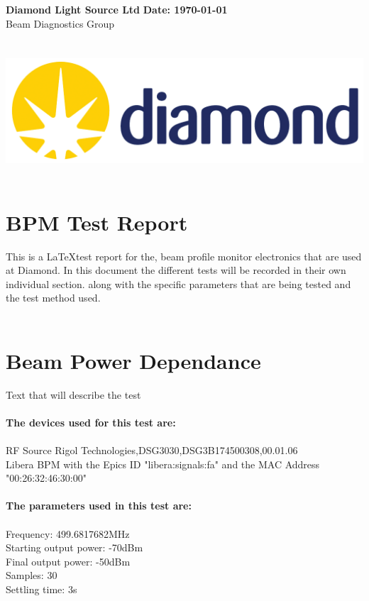 \documentclass[a4paper, 11pt]{article}%
\begin{document}
%
\normalsize%
\noindent%
\large\textbf{Diamond Light Source Ltd} \hfill\large\textbf{Date: \today}%
\\\normalsize Beam Diagnostics Group \hfill\\%
\\\\\includegraphics[width = 1\textwidth]{./Latex_Report/Logo.PNG}\\\\%
\section*{BPM Test Report}%
This is a \LaTeX test report for the, beam profile monitor electronics that are used at Diamond. In this document the different tests will be recorded in their own individual section. along with the specific parameters that are being tested and the test method used.\\\\%
\clearpage%
\tableofcontents%
\listoffigures%
\clearpage%
\section{Beam Power Dependance}%
Text that will describe the test\\\\%
\textbf{The devices used for this test are:}\\\\%
RF Source Rigol Technologies,DSG3030,DSG3B174500308,00.01.06\\%
Libera BPM with the Epics ID "libera:signals:fa" and the MAC Address "00:26:32:46:30:00"\\%
\\%
\textbf{The parameters used in this test are:}\\\\%
Frequency: 499.6817682MHz\\%
Starting output power: -70dBm\\%
Final output power: -50dBm\\%
Samples: 30\\%
Settling time: 3s\\
\end{document}
